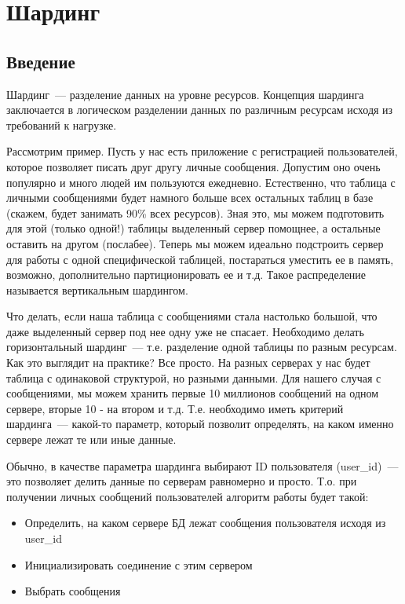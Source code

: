 \chapter{Шардинг}
\begin{epigraphs}
\end{epigraphs}
\section{Введение}
Шардинг~--- разделение данных на уровне ресурсов. Концепция шардинга заключается в логическом разделении данных по различным
ресурсам исходя из требований к нагрузке.

Рассмотрим пример. Пусть у нас есть приложение с регистрацией пользователей, которое позволяет писать друг другу
личные сообщения. Допустим оно очень популярно и много людей им пользуются ежедневно. Естественно, что таблица с личными
сообщениями будет намного больше всех остальных таблиц в базе (скажем, будет занимать 90\% всех ресурсов). Зная это,
мы можем подготовить для этой (только одной!) таблицы выделенный сервер помощнее, а остальные оставить на другом (послабее).
Теперь мы можем идеально подстроить сервер для работы с одной специфической таблицей, постараться уместить ее в память, возможно,
дополнительно партиционировать ее и т.д. Такое распределение называется вертикальным шардингом.

Что делать, если наша таблица с сообщениями стала настолько большой, что даже выделенный сервер под нее одну уже не спасает.
Необходимо делать горизонтальный шардинг~--- т.е. разделение одной таблицы по разным ресурсам. Как это выглядит на практике?
Все просто. На разных серверах у нас будет таблица с одинаковой структурой, но разными данными. Для нашего случая с сообщениями,
мы можем хранить первые 10 миллионов сообщений на одном сервере, вторые 10 - на втором и т.д. Т.е. необходимо иметь критерий
шардинга~--- какой-то параметр, который позволит определять, на каком именно сервере лежат те или иные данные.

Обычно, в качестве параметра шардинга выбирают ID пользователя (user\_id)~--- это позволяет делить данные по серверам равномерно
и просто. Т.о. при получении личных сообщений пользователей алгоритм работы будет такой:
\begin{itemize}
\item Определить, на каком сервере БД лежат сообщения пользователя исходя из user\_id
\item Инициализировать соединение с этим сервером
\item Выбрать сообщения
\end{itemize}

